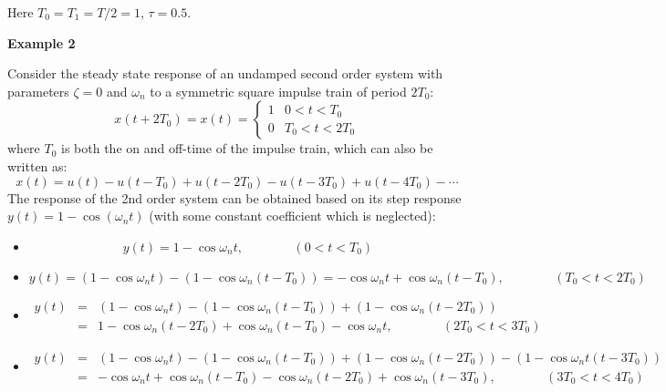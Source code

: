 
Here $T_0=T_1=T/2=1$, $\tau=0.5$.


{\bf Example 2} 

Consider the steady state response of an undamped second order system with
parameters $\zeta=0$ and $\omega_n$ to a symmetric square impulse train of
period $2T_0$:
\[
x(t+2T_0)=x(t)=\left\{ \begin{array}{cl}1&0<t<T_0\\0&T_0<t<2T_0\end{array}\right.
\]
where $T_0$ is both the on and off-time of the impulse train, which can also
be written as:
\[
x(t)=u(t)-u(t-T_0)+u(t-2T_0)-u(t-3T_0)+u(t-4T_0)- \cdots 
\]
The response of the 2nd order system can be obtained based on its step
response $y(t)=1-\cos(\omega_nt)$ (with some constant coefficient which 
is neglected):
\begin{itemize}
\item
  \[
  y(t)=1-\cos\omega_nt,\;\;\;\;\;\;\;\;\;\;\;\;\;\;(0<t<T_0) 
  \]
\item 
  \[
  y(t)=(1-\cos\omega_nt)-(1-\cos\omega_n(t-T_0))
  =-\cos\omega_nt+\cos\omega_n(t-T_0),\;\;\;\;\;\;\;\;\;\;\;\;\;\;(T_0<t<2T_0) 
  \]
\item
  \begin{eqnarray}
    y(t)&=&(1-\cos\omega_nt)-(1-\cos\omega_n(t-T_0))+(1-\cos\omega_n(t-2T_0))
    \nonumber \\
    &=&1-\cos\omega_n(t-2T_0)+\cos\omega_n(t-T_0)-\cos\omega_nt,
    \;\;\;\;\;\;\;\;\;\;\;\;\;\;(2T_0<t<3T_0)
    \nonumber 
  \end{eqnarray}
\item 
  \begin{eqnarray} 
    y(t)&=&(1-\cos\omega_nt)-(1-\cos\omega_n(t-T_0))+(1-\cos\omega_n(t-2T_0))
    -(1-\cos\omega_nt(t-3T_0))
    \nonumber \\
    &=&-\cos\omega_nt+\cos\omega_n(t-T_0)-\cos\omega_n(t-2T_0)+\cos\omega_n(t-3T_0),
    \;\;\;\;\;\;\;\;\;\;\;\;\;\;(3T_0<t<4T_0)
    \nonumber 
  \end{eqnarray}
\end{itemize}

